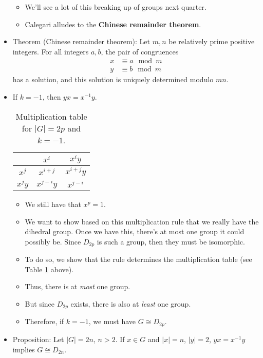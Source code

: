 \documentclass[../notes.tex]{subfiles}
\begin{document}
\begin{itemize}
\begin{itemize}
        \item We'll see a lot of this breaking up of groups next quarter.
        \item Calegari alludes to the \textbf{Chinese remainder theorem}.
    \end{itemize}
    \item Theorem (Chinese remainder theorem): Let $m,n$ be relatively prime positive integers. For all integers $a,b$, the pair of congruences
    \begin{align*}
        x &\equiv a\mod m\\
        y &\equiv b\mod m
    \end{align*}
    has a solution, and this solution is uniquely determined modulo $mn$.
    \item If $k=-1$, then $yx=x^{-1}y$.
    \begin{table}[h!]
        \centering
        \small
        \renewcommand{\arraystretch}{1.2}
        \begin{tabular}{c|c|c}
             & $x^i$ & $x^iy$\\
            \hline
            $x^j$ & $x^{i+j}$ & $x^{i+j}y$\\
            $x^jy$ & $x^{j-i}y$ & $x^{j-i}$\\
        \end{tabular}
        \caption{Multiplication table for $|G|=2p$ and $k=-1$.}
        \label{tab:2pmult}
    \end{table}
    \begin{itemize}
        \item We still have that $x^p=1$.
        \item We want to show based on this multiplication rule that we really have the dihedral group. Once we have this, there's at most one group it could possibly be. Since $D_{2p}$ is such a group, then they must be isomorphic.
        \item To do so, we show that the rule determines the multiplication table (see Table \ref{tab:2pmult} above).
        \item Thus, there is at \emph{most} one group.
        \item But since $D_{2p}$ exists, there is also at \emph{least} one group.
        \item Therefore, if $k=-1$, we must have $G\cong D_{2p}$.
    \end{itemize}
    \item Proposition: Let $|G|=2n$, $n>2$. If $x\in G$ and $|x|=n$, $|y|=2$, $yx=x^{-1}y$ implies $G\cong D_{2n}$.

\end{itemize}
\end{document}
